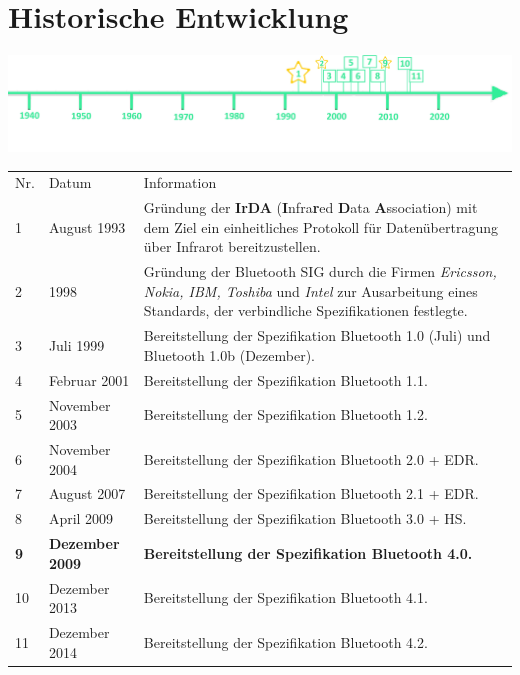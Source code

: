 \section*{Historische Entwicklung}
\includegraphics[width=\textwidth]{Kapitel/BLE/Grafiken/Zeitstrahl}
\par
\noindent
{}
\begin{tabular}{p{0.5 cm}p{3 cm}p{13.55 cm}}
	Nr. & Datum & Information \\
	1 & August 1993 & Gründung der \textbf{IrDA} (\textbf{I}nfra\textbf{r}ed \textbf{D}ata \textbf{A}ssociation) mit dem Ziel ein einheitliches Protokoll für Datenübertragung über Infrarot bereitzustellen.\\
	2 & 1998 & Gründung der Bluetooth SIG durch die Firmen \textit{Ericsson, Nokia, IBM, Toshiba} und \textit{Intel} zur Ausarbeitung eines Standards, der verbindliche Spezifikationen festlegte.\\
	3 & Juli 1999 & Bereitstellung der Spezifikation Bluetooth 1.0 (Juli) und Bluetooth 1.0b (Dezember).\\
	4 & Februar 2001 & Bereitstellung der Spezifikation Bluetooth 1.1.\\
	5 & November 2003 & Bereitstellung der Spezifikation Bluetooth 1.2.\\
	6 & November 2004 & Bereitstellung der Spezifikation Bluetooth 2.0 + EDR.\\
	7 & August 2007 & Bereitstellung der Spezifikation Bluetooth 2.1 + EDR.\\
	8 & April 2009 & Bereitstellung der Spezifikation Bluetooth 3.0 + HS.\\
	\textbf{9} & \textbf{Dezember 2009} & \textbf{Bereitstellung der Spezifikation Bluetooth 4.0.}\\
	10 & Dezember 2013 & Bereitstellung der Spezifikation Bluetooth 4.1.\\
	11 & Dezember 2014 & Bereitstellung der Spezifikation Bluetooth 4.2.\\
\end{tabular}
\par
